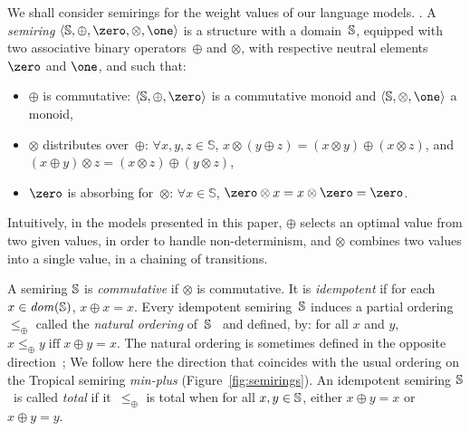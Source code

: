 %
%
We shall consider semirings for the weight values of our language models.
%
.
A \emph{semiring} $\< \Semiring, \oplus, \zero, \otimes, \one>$ 
is a structure with a domain~$\mathbb{S}$,
equipped with two associative
binary operators~$\oplus$ and $\otimes$,
with respective neutral elements $\zero$ and $\one$, and such that:
\begin{itemize}
\item $\oplus$ is commutative: 
 $\< \Semiring, \oplus, \zero>$ is a commutative monoid 
   and $\< \Semiring, \otimes, \one>$ a monoid,
\item $\otimes$ distributes over~$\oplus$:  $\forall x, y, z \in \mathbb{S}$,
$x \otimes (y \oplus z) = (x \otimes y) \oplus (x \otimes z)$, 
and $(x \oplus y) \otimes z = (x \otimes z) \oplus (y \otimes z)$,
\item $\zero$ is absorbing for~$\otimes$: 
$\forall x\in \mathbb{S}$, $\zero \otimes x = x \otimes \zero = \zero$.
\end{itemize}
%
Intuitively, in the models presented in this paper, 
$\oplus$ selects an optimal value from two given values, 
in order to handle non-determinism, 
and $\otimes$ combines two values into a single value, 
in a chaining of transitions.

\medskip%
A semiring $\mathbb{S}$ is \emph{commutative} if $\otimes$ is commutative.
It is \emph{idempotent} if for each $x \in \mathit{dom}(\mathbb{S})$, $x \oplus x = x$.
%
Every idempotent semiring~$\mathbb{S}$ induces 
a partial ordering~$\leq_\oplus$ 
called the \emph{natural ordering} of~$\mathbb{S}$~\cite{Mohri02semiring} 
and defined,  by: 
for all $x$ and $y$,
$x \leq_\oplus y \;\mbox{iff}\; x \oplus y = x$.
%
The natural ordering is sometimes defined in the opposite direction~\cite{DrosteKuich09semirings};
We follow here the direction  %
that coincides with the usual ordering on the Tropical semiring \emph{min-plus} 
(Figure~\ref{fig:semirings}).
%
\noindent
An idempotent semiring $\mathbb{S}$~is called \emph{total} if
it~$\leq_\oplus$ is total
\ie when for all $x, y \in \mathbb{S}$, either $x \oplus y = x$ or $x \oplus y = y$.

